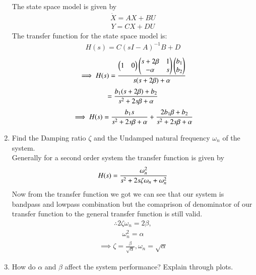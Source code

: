 \begin{enumerate}[label=\thesubsection.\arabic*.,ref=\thesubsection.\theenumi]
\solution The state space model is given by
\begin{align}
\dot{X} = AX + BU
\end{align}
\begin{align}
Y = CX + DU
\end{align}
%
The transfer function for the state space model is:
\begin{align}
H(s) = C(sI - A)^{-1}B + D
\end{align}
\begin{align}
\implies H(s) = \frac
{
\begin{pmatrix}1&0\end{pmatrix}\begin{pmatrix}s+2\beta&1\\-\alpha&s\end{pmatrix}\begin{pmatrix}b_{1}\\b_{2}\end{pmatrix}
}
{
s(s+2\beta) + \alpha
}
\end{align}
\begin{align}
= \LARGE{\frac{b_{1}(s+2\beta) + b_{2}}{s^{2}+2s\beta+\alpha}}
\end{align}
\begin{align}
   \implies H(s) = \LARGE{\frac{b_{1}s}{s^{2}+2s\beta+\alpha}} + \LARGE{\frac{2b_{1}\beta + b_{2}}{s^{2}+2s\beta+\alpha}}
\end{align}
%
\item Find the Damping ratio $\zeta$ and the Undamped natural frequency $\omega_{n}$ of the system.
\\
\solution
Generally for a second order system the transfer function is given by
\begin{align}
H(s) = \LARGE{\frac{\omega_{n}^2}{s^{2}+2s\zeta\omega_{n}+\omega_{n}^2}}
\end{align}
Now from the transfer function we got we can see that our system is bandpass and lowpass combination but the comaprison of denominator of our transfer function to the general transfer function is still valid.
\begin{align}
\therefore 2\zeta\omega_{n} = 2\beta,
\end{align}
\begin{align}
\omega_{n}^2 = \alpha
\end{align}
\begin{align}
\implies \zeta = \frac{\beta}{\sqrt{\alpha}} , \omega_{n} = \sqrt{\alpha}
\end{align}
\item How do $\alpha$ and $\beta$ affect the system performance?  Explain through plots.

\end{enumerate}
